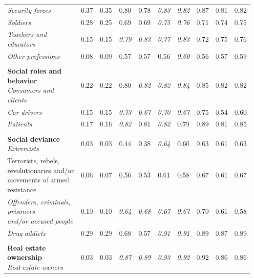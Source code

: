 \begin{table}[htb]
\begin{threeparttable}
\begin{tabular}{l c c c c c c c c c}
\textit{Security forces} & 0.37 & 0.35 & 0.80 & 0.78 & \textit{0.83} & \textit{0.82} & 0.87 & 0.81 & 0.82 \\
\textit{Soldiers} & 0.28 & 0.25 & 0.69 & 0.69 & \textit{0.75} & \textit{0.76} & 0.71 & 0.74 & 0.75 \\
\textit{Teachers and educators} & 0.15 & 0.15 & \textit{0.79} & \textit{0.83} & \textit{0.77} & \textit{0.83} & 0.72 & 0.75 & 0.76 \\
\textit{Other professions} & 0.08 & 0.09 & 0.57 & 0.57 & 0.56 & \textit{0.60} & 0.56 & 0.57 & 0.59 \\
\rule{0pt}{5pt} &  &  &  &  &  &  &  &  &  \\
\shortstack[l]{\textbf{Social roles and behavior}\\[3pt]\textit{Consumers and clients}} & 0.22 & 0.22 & 0.80 & \textit{0.82} & \textit{0.82} & \textit{0.84} & 0.85 & 0.82 & 0.82 \\
\textit{Car drivers} & 0.15 & 0.15 & \textit{0.73} & \textit{0.67} & \textit{0.70} & \textit{0.67} & 0.75 & 0.54 & 0.60 \\
\textit{Patients} & 0.17 & 0.16 & \textit{0.82} & 0.81 & \textit{0.82} & 0.79 & 0.89 & 0.81 & 0.85 \\
\rule{0pt}{5pt} &  &  &  &  &  &  &  &  &  \\
\shortstack[l]{\textbf{Social deviance}\\[3pt]\textit{Extremists}} & 0.03 & 0.03 & 0.44 & 0.38 & \textit{0.64} & 0.60 & 0.63 & 0.61 & 0.63 \\
\shortstack[l]{Terrorists, rebels,\\[-3pt]revolutionaries and/or\\[-3pt]movements of armed resistance} & 0.06 & 0.07 & 0.56 & 0.53 & 0.61 & 0.58 & 0.67 & 0.61 & 0.67 \\
\shortstack[l]{\textit{Offenders, criminals, prisoners}\\[-3pt]\textit{and/or accused people}} & 0.10 & 0.10 & \textit{0.64} & \textit{0.68} & \textit{0.67} & \textit{0.67} & 0.70 & 0.61 & 0.58 \\
\textit{Drug addicts} & 0.29 & 0.29 & 0.68 & 0.57 & \textit{0.91} & \textit{0.91} & 0.89 & 0.87 & 0.89 \\
\rule{0pt}{5pt} &  &  &  &  &  &  &  &  &  \\
\shortstack[l]{\textbf{Real estate ownership}\\[3pt]\textit{Real-estate owners}} & 0.03 & 0.03 & \textit{0.87} & \textit{0.89} & \textit{0.93} & \textit{0.92} & 0.92 & 0.86 & 0.86 \\

\end{tabular}
\end{threeparttable}
\end{table}
